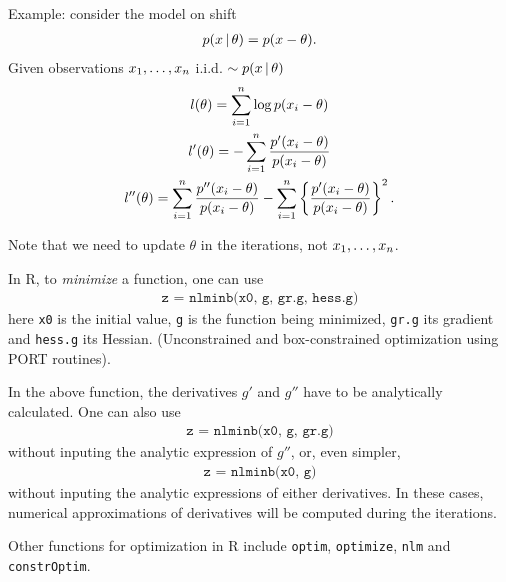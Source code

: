   \begin{frame}[t]
\noindent Example: consider the model on shift
    \begin{align*}
      p(x\,|\, \theta) = p(x-\theta).
    \end{align*}
    Given observations ${x}_1, \ldots, {x}_{n}$ i.i.d. $\sim p(x\,|\, \theta)$
    \begin{gather*}
      l(\theta) = \sum_{i=1}^n \log p(x_i - \theta) \\
      l'(\theta) = -\sum_{i=1}^n \frac{p'(x_i-\theta)}{p(x_i-\theta)}
      \\
      l''(\theta) = \sum_{i=1}^n
      \frac{p''(x_i-\theta)}{p(x_i-\theta)} -
      \sum_{i=1}^n \left\{\frac{p'(x_i-\theta)}{p(x_i-\theta)}\right\}^2.
    \end{gather*}

    Note that we need to update $\theta$ in the iterations, not ${x}_1, \ldots, {x}_{n}$.

  \end{frame}

  \begin{frame}
  In R, to \emph{minimize\/} a function, one can use
  \begin{align*}
    \texttt{z = nlminb(x0, g, gr.g, hess.g)}
  \end{align*}
  here \texttt{x0} is the initial value, \texttt{g} is the function
  being minimized, \texttt{gr.g} its gradient and \texttt{hess.g} its
  Hessian. (Unconstrained and box-constrained optimization using PORT routines).

  In the above function, the derivatives $g'$ and $g''$ have to
  be analytically calculated.  One can also use
  \begin{align*}
    \texttt{z = nlminb(x0, g, gr.g)}
  \end{align*}
  without inputing the analytic expression of $g''$, or, even simpler,
  \begin{align*}
    \texttt{z = nlminb(x0, g)}
  \end{align*}
  without inputing the analytic expressions of either derivatives.  In
  these cases, numerical approximations of derivatives will be
  computed during the iterations.

  Other functions for optimization in R include \texttt{optim}, \texttt{optimize}, \texttt{nlm} and \texttt{constrOptim}.

  \end{frame}

